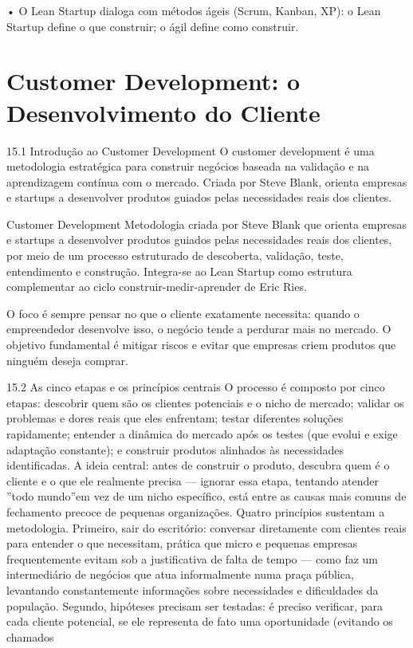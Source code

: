 • O Lean Startup dialoga com métodos ágeis (Scrum, Kanban, XP): o Lean Startup define o que construir; o ágil define como construir.

\chapter{Customer Development: o Desenvolvimento do Cliente}

15.1 Introdução ao Customer Development O customer development é uma metodologia estratégica para construir negócios baseada na validação e na aprendizagem contínua com o mercado. Criada por Steve Blank, orienta empresas e startups a desenvolver produtos guiados pelas necessidades reais dos clientes.

Customer Development Metodologia criada por Steve Blank que orienta empresas e startups a desenvolver produtos guiados pelas necessidades reais dos clientes, por meio de um processo estruturado de descoberta, validação, teste, entendimento e construção. Integra-se ao Lean Startup como estrutura complementar ao ciclo construir-medir-aprender de Eric Ries.

O foco é sempre pensar no que o cliente exatamente necessita: quando o empreendedor desenvolve isso, o negócio tende a perdurar mais no mercado. O objetivo fundamental é mitigar riscos e evitar que empresas criem produtos que ninguém deseja comprar.

15.2 As cinco etapas e os princípios centrais O processo é composto por cinco etapas: descobrir quem são os clientes potenciais e o nicho de mercado; validar os problemas e dores reais que eles enfrentam; testar diferentes soluções rapidamente; entender a dinâmica do mercado após os testes (que evolui e exige adaptação constante); e construir produtos alinhados às necessidades identificadas. A ideia central: antes de construir o produto, descubra quem é o cliente e o que ele realmente precisa — ignorar essa etapa, tentando atender ”todo mundo”em vez de um nicho específico, está entre as causas mais comuns de fechamento precoce de pequenas organizações. Quatro princípios sustentam a metodologia. Primeiro, sair do escritório: conversar diretamente com clientes reais para entender o que necessitam, prática que micro e pequenas empresas frequentemente evitam sob a justificativa de falta de tempo — como faz um intermediário de negócios que atua informalmente numa praça pública, levantando constantemente informações sobre necessidades e dificuldades da população. Segundo, hipóteses precisam ser testadas: é preciso verificar, para cada cliente potencial, se ele representa de fato uma oportunidade (evitando os chamados

